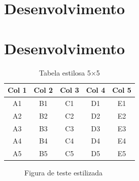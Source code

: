 \documentclass{Arquivos/AcademicoPadrao}
\begin{document}
\section{Desenvolvimento}
\section{Desenvolvimento}

\begin{table}[ht]
    \centering
    \caption{Tabela estilosa 5×5}
    \label{tab:estilosa}
    \begin{tabular}{ccccc}
        \toprule
        Col 1 & Col 2 & Col 3 & Col 4 & Col 5 \\
        \midrule
        A1 & B1 & C1 & D1 & E1 \\
        A2 & B2 & C2 & D2 & E2 \\
        A3 & B3 & C3 & D3 & E3 \\
        A4 & B4 & C4 & D4 & E4 \\
        A5 & B5 & C5 & D5 & E5 \\
        \bottomrule
    \end{tabular}
\end{table}

\begin{figure}[ht]
    \centering
    \caption{Figura de teste estilizada}
    \label{fig:teste-estilosa}
\end{figure}
\end{document}
